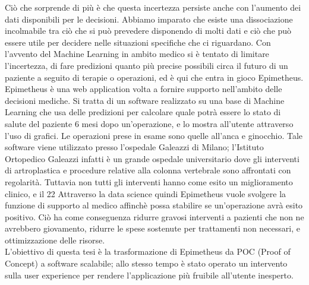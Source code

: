 Ciò che sorprende di più è che questa incertezza persiste anche con l'aumento dei dati disponibili per le decisioni. Abbiamo imparato che esiste una dissociazione incolmabile tra ciò che si può prevedere disponendo di molti dati e ciò che può essere utile per decidere nelle situazioni specifiche che ci riguardano. 
Con l'avvento del Machine Learning in ambito medico si è tentato di limitare l'incertezza, di fare predizioni quanto più precise possibili circa il futuro di un paziente a seguito di terapie o operazioni, ed è qui che entra in gioco Epimetheus.\\

Epimetheus è una web application volta a fornire supporto nell'ambito delle decisioni mediche. Si tratta di un software realizzato su una base di Machine Learning che usa delle  predizioni per calcolare quale potrà essere lo stato di salute del paziente 6 mesi dopo un'operazione, e lo mostra all'utente attraverso l'uso di grafici. Le operazioni prese in esame sono quelle all'anca e ginocchio. Tale software viene utilizzato presso l'ospedale Galeazzi di Milano; l'Istituto Ortopedico Galeazzi infatti è un grande ospedale universitario dove gli interventi di artroplastica e procedure relative alla colonna vertebrale sono affrontati con regolarità. Tuttavia non tutti gli interventi hanno come esito un miglioramento clinico, e il 22%
Attraverso la data science quindi Epimetheus vuole svolgere la funzione di supporto al medico affinchè possa stabilire se un'operazione avrà esito positivo. Ciò ha come conseguenza ridurre gravosi interventi a pazienti che non ne avrebbero giovamento, ridurre le spese sostenute per trattamenti non necessari, e ottimizzazione delle risorse. \\

L'obiettivo di questa tesi è la trasformazione di Epimetheus da POC (Proof of Concept) a software scalabile; allo stesso tempo è stato operato un intervento sulla user experience per rendere l'applicazione più fruibile all'utente inesperto.

